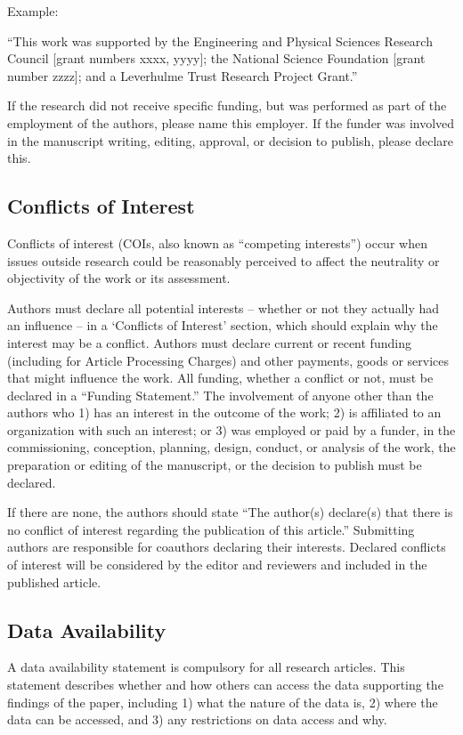 \documentclass{article}
\begin{document}
\medskip Example: 

``This work was supported by the Engineering and Physical Sciences Research Council [grant numbers xxxx, yyyy]; the National Science Foundation [grant number zzzz]; and a Leverhulme Trust Research Project Grant.'' 

\medskip
If the research did not receive specific funding, but was performed as part of the employment of the authors, please name this employer. If the funder was involved in the manuscript writing, editing, approval, or decision to publish, please declare this.

\subsection*{Conflicts of Interest}
Conflicts of interest (COIs, also known as ``competing interests'') occur when issues outside research could be reasonably perceived to affect the neutrality or objectivity of the work or its assessment. 

Authors must declare all potential interests – whether or not they actually had an influence – in a ‘Conflicts of Interest’ section, which should explain why the interest may be a conflict. Authors must declare current or recent funding (including for Article Processing Charges) and other payments, goods or services that might influence the work. All funding, whether a conflict or not, must be declared in a ``Funding Statement.'' The involvement of anyone other than the authors who 1) has an interest in the outcome of the work; 2) is affiliated to an organization with such an interest; or 3) was employed or paid by a funder, in the commissioning, conception, planning, design, conduct, or analysis of the work, the preparation or editing of the manuscript, or the decision to publish must be declared.

If there are none, the authors should state ``The author(s) declare(s) that there is no conflict of interest regarding the publication of this article.'' Submitting authors are responsible for coauthors declaring their interests. Declared conflicts of interest will be considered by the editor and reviewers and included in the published article.

\subsection*{Data Availability}
A data availability statement is compulsory for all research articles. This statement describes whether and how others can access the data supporting the findings of the paper, including 1) what the nature of the data is, 2) where the data can be accessed, and 3) any restrictions on data access and why.
\end{document}
